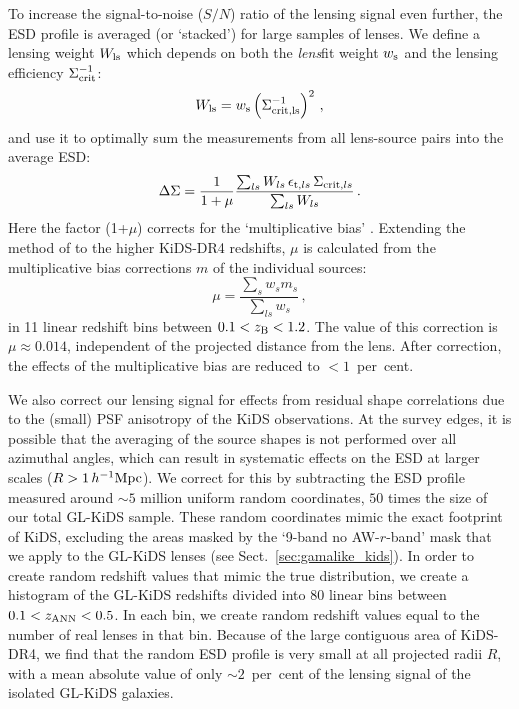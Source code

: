 \documentclass[usenatbib]{mnras}
\newcommand{\hMpc}{\, h^{-1}{\rm{Mpc}} }
\newcommand{\un}[1]{_{\rm #1}}
\begin{document}
To increase the signal-to-noise ($S/N$) ratio of the lensing signal even further, the ESD profile is averaged (or `stacked') for large samples of lenses. We define a lensing weight $W\un{ls}$ which depends on both the \emph{lens}fit weight $w\un{s}$ and the lensing efficiency $\Sigma\un{crit}^{-1}$:
\begin{equation}
	W\un{ls} = w\un{s} \left( \Sigma\un{crit,ls}^{-1} \right)^2 \, ,
	\label{eq:weights}
\end{equation}
and use it to optimally sum the measurements from all lens-source pairs into the average ESD:
\begin{equation}
	\Delta\Sigma = \frac{1}{1+\mu} \frac{\sum_{ls} W_{ls} \, \epsilon_{{\rm t},ls} \, \Sigma_{{\rm crit},ls} }{ \sum_{ls}{W_{ls}} }  \, .
	\label{eq:ESDmeasured}
\end{equation}
Here the factor (1+$\mu$) corrects for the `multiplicative bias' \cite[]{fenechconti2017}. Extending the method of \cite{dvornik2017} to the higher KiDS-DR4 redshifts, $\mu$ is calculated from the multiplicative bias corrections $m$ of the individual sources:
\begin{equation}
	\mu=\frac{\sum_{s} w_{s} m_{s}}{\sum_{ls} w_{s}} \, ,
	\label{eq:biascorr}
\end{equation}
in 11 linear redshift bins between \mbox{$0.1<z\un{B}<1.2$}. The value of this correction is $\mu\approx0.014$, independent of the projected distance from the lens. After correction, the effects of the multiplicative bias are reduced to $<1$~per~cent.

We also correct our lensing signal for effects from residual shape correlations due to the (small) PSF anisotropy of the KiDS observations. At the survey edges, it is possible that the averaging of the source shapes is not performed over all azimuthal angles, which can result in systematic effects on the ESD at larger scales ($R>1\hMpc$). We correct for this by subtracting the ESD profile measured around $\sim5$ million uniform random coordinates, $50$ times the size of our total GL-KiDS sample. These random coordinates mimic the exact footprint of KiDS, excluding the areas masked by the `9-band no AW-$r$-band' mask that we apply to the GL-KiDS lenses (see Sect.~\ref{sec:gamalike_kids}). In order to create random redshift values that mimic the true distribution, we create a histogram of the GL-KiDS redshifts divided into $80$ linear bins between $0.1<z\un{ANN}<0.5$. In each bin, we create random redshift values equal to the number of real lenses in that bin. Because of the large contiguous area of KiDS-DR4, we find that the random ESD profile is very small at all projected radii $R$, with a mean absolute value of only $\sim2$~per~cent of the lensing signal of the isolated GL-KiDS galaxies. 
\end{document}
